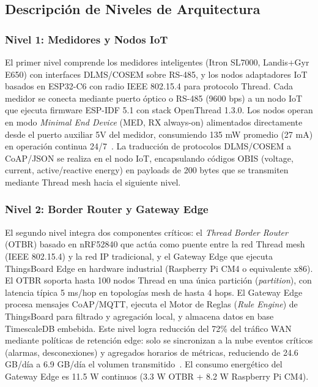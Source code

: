 \subsection{Descripción de Niveles de Arquitectura}

\subsubsection{Nivel 1: Medidores y Nodos IoT}

El primer nivel comprende los medidores inteligentes (Itron SL7000, Landis+Gyr E650) con interfaces DLMS/COSEM sobre RS-485, y los nodos adaptadores IoT basados en ESP32-C6 con radio IEEE 802.15.4 para protocolo Thread. Cada medidor se conecta mediante puerto óptico o RS-485 (9600 bps) a un nodo IoT que ejecuta firmware ESP-IDF 5.1 con stack OpenThread 1.3.0. Los nodos operan en modo \textit{Minimal End Device} (MED, RX always-on) alimentados directamente desde el puerto auxiliar 5V del medidor, consumiendo 135 mW promedio (27 mA) en operación continua 24/7~\cite{krawiecEnergyFootprintReliability2025}. La traducción de protocolos DLMS/COSEM a CoAP/JSON se realiza en el nodo IoT, encapsulando códigos OBIS (voltage, current, active/reactive energy) en payloads de 200 bytes que se transmiten mediante Thread mesh hacia el siguiente nivel.

\subsubsection{Nivel 2: Border Router y Gateway Edge}

El segundo nivel integra dos componentes críticos: el \textit{Thread Border Router} (OTBR) basado en nRF52840 que actúa como puente entre la red Thread mesh (IEEE 802.15.4) y la red IP tradicional, y el Gateway Edge que ejecuta ThingsBoard Edge en hardware industrial (Raspberry Pi CM4 o equivalente x86). El OTBR soporta hasta 100 nodos Thread en una única partición (\textit{partition}), con latencia típica 5 ms/hop en topologías mesh de hasta 4 hops. El Gateway Edge procesa mensajes CoAP/MQTT, ejecuta el Motor de Reglas (\textit{Rule Engine}) de ThingsBoard para filtrado y agregación local, y almacena datos en base TimescaleDB embebida. Este nivel logra reducción del 72\% del tráfico WAN mediante políticas de retención edge: solo se sincronizan a la nube eventos críticos (alarmas, desconexiones) y agregados horarios de métricas, reduciendo de 24.6 GB/día a 6.9 GB/día el volumen transmitido~\cite{alsafranChallengesImplementingIoT2025}. El consumo energético del Gateway Edge es 11.5 W continuos (3.3 W OTBR + 8.2 W Raspberry Pi CM4).

